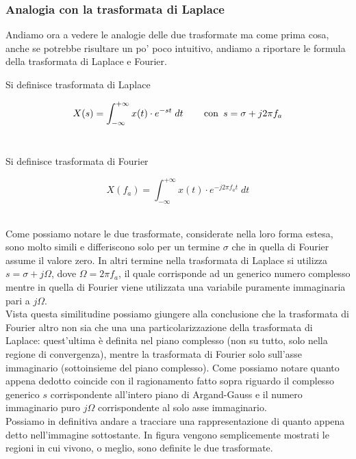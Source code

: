 \documentclass[../main.tex]{subfiles}
\begin{document}
\subsubsection{Analogia con la trasformata di Laplace}

Andiamo ora a vedere le analogie delle due trasformate ma come prima cosa, anche se potrebbe risultare un po' poco intuitivo, andiamo a riportare le formula della trasformata di Laplace e Fourier.

\begin{definition*}
Si definisce trasformata di Laplace
\end{definition*} 

\[ X(s) = \int_{-\infty}^{+\infty} x(t) \cdot e^{-st}\; dt \hspace{20pt} \, \mathrm{con} \hspace{5 pt} s = \sigma + j2\pi f_a \]\

\begin{definition*}
Si definisce trasformata di Fourier
\end{definition*} 

\[ X(f_a) = \int_{-\infty}^{+\infty} x(t) \cdot e^{-j2\pi f_a t} \; dt\]\

Come possiamo notare le due trasformate, considerate nella loro forma estesa, sono molto simili e differiscono solo per un termine $\sigma$ che in quella di Fourier assume il valore zero.
In altri termine nella trasformata di Laplace si utilizza $s = \sigma + j\Omega $, dove $\Omega = 2\pi f_a$, il quale corrisponde ad un generico numero complesso mentre in quella di Fourier viene utilizzata una variabile puramente immaginaria pari a $j\Omega$.\\

Vista questa similitudine possiamo giungere alla conclusione che la trasformata di Fourier altro non sia che una una particolarizzazione della trasformata di Laplace: quest’ultima è definita nel piano complesso (non su tutto, solo nella regione di convergenza), mentre la trasformata di Fourier solo sull’asse immaginario (sottoinsieme del piano complesso). Come possiamo notare quanto appena dedotto coincide con il ragionamento fatto sopra riguardo il complesso generico $s$ corrispondente all'intero piano di Argand-Gauss e il numero immaginario puro $j\Omega$ corrispondente al solo asse immaginario.\\

Possiamo in definitiva andare a tracciare una rappresentazione di quanto appena detto nell'immagine sottostante. In figura vengono semplicemente mostrati le regioni in cui vivono, o meglio, sono definite le due trasformate.
\end{document}
